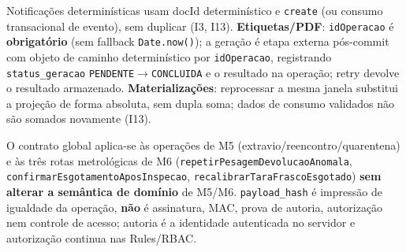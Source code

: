 \begin{regra}
Notificações determinísticas usam docId determinístico e \texttt{create} (ou consumo transacional de evento), sem duplicar (I3, I13). \textbf{Etiquetas/PDF}: \texttt{idOperacao} é \textbf{obrigatório} (sem fallback \texttt{Date.now()}); a geração é etapa externa pós-commit com objeto de caminho determinístico por \texttt{idOperacao}, registrando \texttt{status\_geracao} \texttt{PENDENTE}$\rightarrow$\texttt{CONCLUIDA} e o resultado na operação; retry devolve o resultado armazenado. \textbf{Materializações}: reprocessar a mesma janela substitui a projeção de forma absoluta, sem dupla soma; dados de consumo validados não são somados novamente (I13).
\end{regra}

\begin{regra}
O contrato global aplica-se às operações de M5 (extravio/reencontro/quarentena) e às três rotas metrológicas de M6 (\texttt{repetirPesagemDevolucaoAnomala}, \texttt{confirmarEsgotamentoAposInspecao}, \texttt{recalibrarTaraFrascoEsgotado}) \textbf{sem alterar a semântica de domínio} de M5/M6. \texttt{payload\_hash} é impressão de igualdade da operação, \textbf{não} é assinatura, MAC, prova de autoria, autorização nem controle de acesso; autoria é a identidade autenticada no servidor e autorização continua nas Rules/RBAC.
\end{regra}


